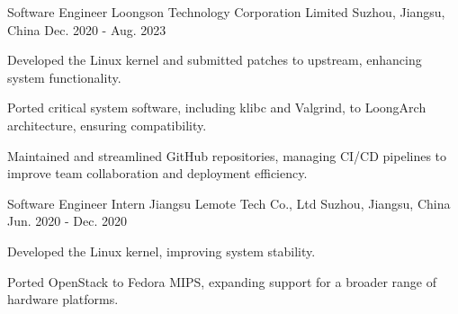 

\begin{cventries}

  \cventry
    {Software Engineer} %
    {Loongson Technology Corporation Limited} %
    {Suzhou, Jiangsu, China} %
    {Dec. 2020 - Aug. 2023} %
    {
      \begin{cvitems} %
        \item {Developed the Linux kernel and submitted patches to upstream, enhancing system functionality.}
        \item {Ported critical system software, including klibc and Valgrind, to LoongArch architecture, ensuring compatibility.}
        \item {Maintained and streamlined GitHub repositories, managing CI/CD pipelines to improve team collaboration and deployment efficiency.}      \end{cvitems}
    }

  \cventry
    {Software Engineer Intern} %
    {Jiangsu Lemote Tech Co., Ltd} %
    {Suzhou, Jiangsu, China} %
    {Jun. 2020 - Dec. 2020} %
    {
      \begin{cvitems} %
        \item {Developed the Linux kernel, improving system stability.}
        \item {Ported OpenStack to Fedora MIPS, expanding support for a broader range of hardware platforms.}
      \end{cvitems}
    }

\end{cventries}

